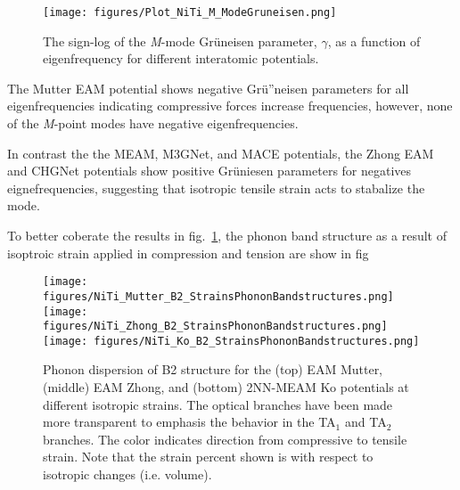 \documentclass[preprint,colorlinks=true,linkcolor=black,citecolor=black]{elsarticle}
\begin{document}
\begin{figure}[!htp]
	 \centering
	\texttt{[image: figures/Plot\_NiTi\_M\_ModeGruneisen.png]}
	\label{fig:modegruneisen}
	\caption{The sign-log of the \textit{M}-mode Gr\"{u}neisen
	parameter, $\gamma$, as a function of eigenfrequency for different
	interatomic potentials.}
\end{figure}

The Mutter EAM potential shows negative Gr\"{u}''neisen parameters for
all eigenfrequencies indicating compressive forces increase
frequencies, however, none of the \textit{M}-point modes have negative
eigenfrequencies. \par

In contrast the the MEAM, M3GNet, and MACE potentials, the Zhong EAM
and CHGNet potentials show positive Gr\"{u}niesen parameters for
negatives eignefrequencies, suggesting that isotropic tensile strain
acts to stabalize the mode. \par

To better coberate the results in fig.~\ref{fig:modegruneisen}, the
phonon band structure as a result of isoptroic strain applied in
compression and tension are show in fig

\begin{figure}[!htp]
	\begin{centering}
		\texttt{[image: figures/NiTi\_Mutter\_B2\_StrainsPhononBandstructures.png]} \vspace{1mm}
		\texttt{[image: figures/NiTi\_Zhong\_B2\_StrainsPhononBandstructures.png]} \vspace{1mm}
		\texttt{[image: figures/NiTi\_Ko\_B2\_StrainsPhononBandstructures.png]}
		\caption{ Phonon dispersion of B2 structure for the (top) EAM
			Mutter, (middle) EAM Zhong, and (bottom) 2NN-MEAM Ko potentials
			at different isotropic strains. The optical branches have been
			made more transparent to emphasis the behavior in the TA$_1$ and
			TA$_2$ branches. The color indicates direction from compressive
			to tensile strain. Note that the strain percent shown is with
			respect to isotropic changes (i.e. volume).  }
		\label{fig:mutter_zhong_ko_phonon_b2}
	\end{centering}
\end{figure}

\end{document}
